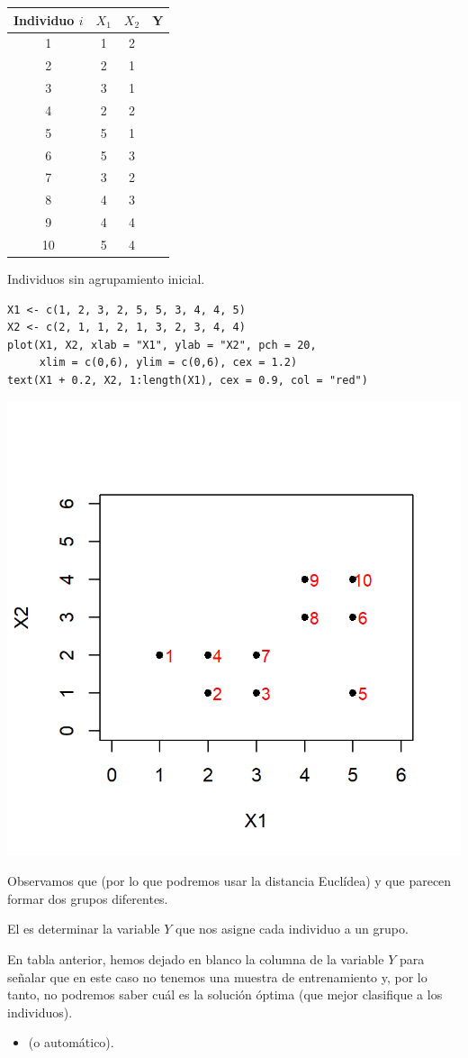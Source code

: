 \begin{center}
\begin{tabular}{c|ccc}
Individuo $i$ & $X_1$ & $X_2$ & Y \\
\hline
1 & 1 & 2 &  \\
2 & 2 & 1 &  \\
3 & 3 & 1 &  \\
4 & 2 & 2 &  \\
5 & 5 & 1 &  \\
6 & 5 & 3 &  \\
7 & 3 & 2 &  \\
8 & 4 & 3 &  \\
9 & 4 & 4 &  \\
10 & 5 & 4 &  \\
\hline
\end{tabular}
\end{center}
Individuos sin agrupamiento inicial.
\begin{lstlisting}
X1 <- c(1, 2, 3, 2, 5, 5, 3, 4, 4, 5)
X2 <- c(2, 1, 1, 2, 1, 3, 2, 3, 4, 4)
plot(X1, X2, xlab = "X1", ylab = "X2", pch = 20, 
     xlim = c(0,6), ylim = c(0,6), cex = 1.2)
text(X1 + 0.2, X2, 1:length(X1), cex = 0.9, col = "red")
\end{lstlisting}
\begin{center}
\includegraphics[width=0.5\linewidth]{"Temas/Imágenes/Tema 6/screenshot001"}
\end{center}
Observamos que  (por lo que podremos usar la distancia Euclídea) y que parecen formar dos grupos diferentes.

El  es determinar la variable $Y$ que nos asigne cada individuo a un grupo.

En tabla anterior, hemos dejado en blanco la columna de la variable $Y$ para señalar que en este caso no tenemos una muestra de entrenamiento y, por lo tanto, no podremos saber cuál es la solución óptima (que mejor clasifique a los individuos).
\begin{itemize}
\item {} (o automático).
\end{itemize}